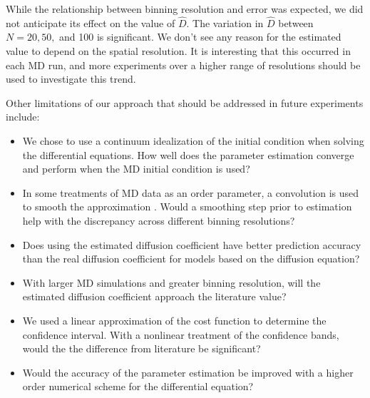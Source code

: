 \documentclass[12pt, reqno]{report}
\theoremstyle{definition}
\theoremstyle{remark}
\begin{document}
While the relationship between binning resolution and error was expected, we did not anticipate its effect on the value of $\hat D$.
The variation in $\hat D$ between $N=20,50,$ and 100 is significant.
We don't see any reason for the estimated value to depend on the spatial resolution. 
It is interesting that this occurred in each MD run, and more experiments over a higher range of resolutions should be used to investigate this trend.

Other limitations of our approach that should be addressed in future experiments include:
\begin{itemize}
    \item We chose to use a continuum idealization of the initial condition when solving the differential equations. How well does the parameter estimation converge and perform when the MD initial condition is used?

    \item In some treatments of MD data as an order parameter, a convolution is used to smooth the approximation \cite{larson_1997_hydrodynamics}.
    Would a smoothing step prior to estimation help with the discrepancy across different binning resolutions?

    \item Does using the estimated diffusion coefficient have better prediction accuracy than the real diffusion coefficient for models based on the diffusion equation?

    \item With larger MD simulations and greater binning resolution, will the estimated diffusion coefficient approach the literature value?

    \item We used a linear approximation of the cost function to determine the confidence interval. With a nonlinear treatment of the confidence bands, would the the difference from literature be significant?
    
    \item Would the accuracy of the parameter estimation be improved with a higher order numerical scheme for the differential equation?
\end{itemize}
\end{document}
